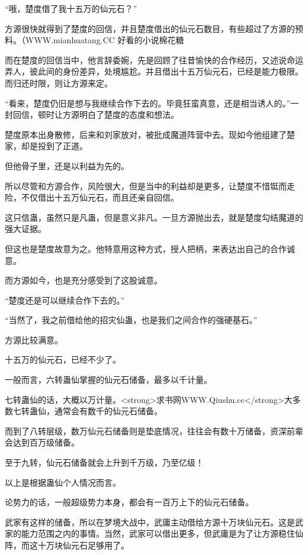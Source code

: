 
\begin{this_body}

“哦，楚度借了我十五万的仙元石？”

方源很快就得到了楚度的回信，并且楚度借出的仙元石数目，有些超过了方源的预料。（WWW.mianhuatang.CC 好看的小说棉花糖

而在楚度的回信当中，他言辞委婉，先是回顾了往昔愉快的合作经历，又述说命运弄人，彼此间的身份差异，处境尴尬。并且借出十五万仙元石，已经是能力极限。而归还时限，则让方源来定。

“看来，楚度仍旧是想与我继续合作下去的。毕竟狂蛮真意，还是相当诱人的。”一封回信，顿时让方源明白了楚度的态度和想法。

楚度原本出身散修，后来和刘家放对，被批成魔道阵营中去。现如今他组建了楚家，却是投到了正道。

但他骨子里，还是以利益为先的。

所以尽管和方源合作，风险很大，但是当中的利益却是更多，让楚度不惜铤而走险，不仅借出十五万仙元石，而且还亲自回信。

这只信蛊，虽然只是凡蛊，但是意义非凡。一旦方源抛出去，就是楚度勾结魔道的强大证据。

但这也是楚度故意为之。他特意用这种方式，授人把柄，来表达出自己的合作诚意。

而方源如今，也是充分感受到了这股诚意。

“楚度还是可以继续合作下去的。”

“当然了，我之前借给他的招灾仙蛊，也是我们之间合作的强硬基石。”

方源比较满意。

十五万的仙元石，已经不少了。

一般而言，六转蛊仙掌握的仙元石储备，最多以千计量。

七转蛊仙的话，大概以万计量。<strong>求书网WWW.Qiushu.cc</strong>大多数七转蛊仙，通常会有数千的仙元石储备。

而到了八转层级，数万仙元石储备则是垫底情况，往往会有数十万储备，资深前辈会达到百万级储备。

至于九转，仙元石储备就会上升到千万级，乃至亿级！

以上是根据蛊仙个人情况而言。

论势力的话，一般超级势力本身，都会有一百万上下的仙元石储备。

武家有这样的储备，所以在梦境大战中，武庸主动借给方源十万块仙元石。这是武家的能力范围之内的事情。当然，武家可以借出更多，但武庸是为了让方源稳住仙阵，而这十万块仙元石足够用了。


\end{this_body}
